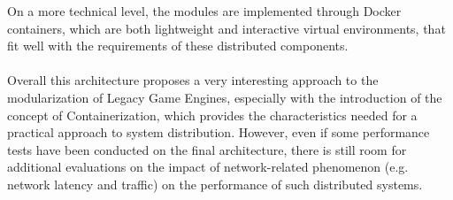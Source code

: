 On a more technical level, the modules are implemented through Docker containers, which are both lightweight and interactive virtual environments, that fit well with the requirements of these distributed components. \\ \\
Overall this architecture proposes a very interesting approach to the modularization of Legacy Game Engines, especially with the introduction of the concept of Containerization, which provides the characteristics needed for a practical approach to system distribution. However, even if some performance tests have been conducted on the final architecture, there is still room for additional evaluations on the impact of network-related phenomenon (e.g. network latency and traffic) on the performance of such distributed systems.


